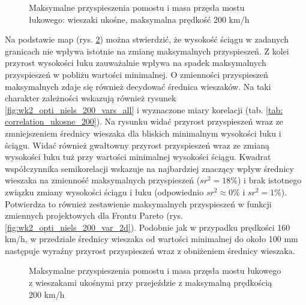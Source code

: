 \begin{figure}[hbt!]
	\centering
	\captionsetup{justification=centering}
	\caption{Maksymalne przyspieszenia pomostu i masa przęsła mostu łukowego: wieszaki ukośne, maksymalna prędkość 200 km/h}
	\label{fig:wk2_opti_niels_200_all}
\end{figure}

Na podstawie map (rys. \ref{fig:wk2_opti_niels_200_variables}) można stwierdzić, że wysokość ściągu w zadanych granicach nie wpływa istotnie na zmianę maksymalnych przyspieszeń. Z kolei przyrost wysokości łuku zauważalnie wpływa na spadek maksymalnych przyspieszeń w pobliżu wartości minimalnej. O zmienności przyspieszeń maksymalnych zdaje się również decydować średnica wieszaków. Na taki charakter zależności wskazują również rysunek \ref{fig:wk2_opti_niels_200_vars_all} i wyznaczone miary korelacji (tab. \ref{tab: correlation_ukosne_200}). Na rysunku widać przyrost przyspieszeń wraz ze zmniejszeniem średnicy wieszaka dla bliskich minimalnym wysokości łuku i ściągu. Widać również gwałtowny przyrost przyspieszeń wraz ze zmianą wysokości łuku tuż przy wartości minimalnej wysokości ściągu. Kwadrat współczynnika semikorelacji wskazuje na najbardziej znaczący wpływ średnicy wieszaka na zmienność maksymalnych przyspieszeń ($sr^2=18\%$) i brak istotnego związku zmiany wysokości ściągu i łuku (odpowiednio $sr^2 \approx 0\%$ i $sr^2=1 \%$). Potwierdza to również zestawienie maksymalnych przyspieszeń w funkcji zmiennych projektowych dla Frontu Pareto (rys. \ref{fig:wk2_opti_niels_200_var_2d}). Podobnie jak w przypadku prędkości 160 km/h, w przedziale średnicy wieszaka od wartości minimalnej do około 100 mm następuje wyraźny przyrost przyspieszeń wraz z obniżeniem średnicy wieszaka.


\begin{figure}[hbt!]
	\centering
	\captionsetup{justification=centering}
	\caption{Maksymalne przyspieszenia pomostu i masa przęsła mostu łukowego z wieszakami ukośnymi przy przejeździe z maksymalną prędkością 200 km/h}
	\label{fig:wk2_opti_niels_200_variables}
\end{figure}

